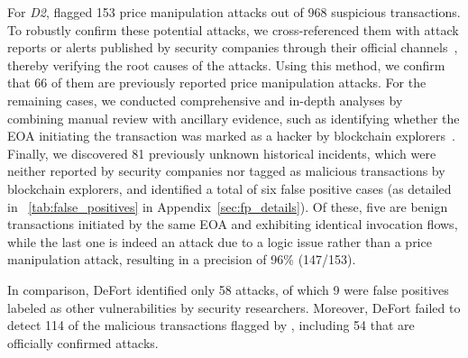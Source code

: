 For \textit{D2}, \tool flagged 153 price manipulation attacks out of 968 suspicious transactions.
To robustly confirm these potential attacks, we cross-referenced them with attack reports or alerts published by security companies through their official channels~\cite{ancilia_twi,beosin_twi,blocksec_twi,slowMist_twi}, thereby verifying the root causes of the attacks.
Using this method, we confirm that 66 of them are previously reported price manipulation attacks.
For the remaining cases, we conducted comprehensive and in-depth analyses by combining manual review with ancillary evidence, such as identifying whether the EOA initiating the transaction was marked as a hacker by blockchain explorers~\cite{bscscan,etherscan,oklink}.
Finally, we discovered 81 previously unknown historical incidents, which were neither reported by security companies nor tagged as malicious transactions by blockchain explorers, and identified a total of six false positive cases (as detailed in \mytab~\ref{tab:false_positives} in Appendix~\ref{sec:fp_details}).
Of these, five are benign transactions initiated by the same EOA and exhibiting identical invocation flows, while the last one is indeed an attack due to a logic issue rather than a price manipulation attack, resulting in a precision of 96\% (147/153).

In comparison, DeFort identified only 58 attacks, of which 9 were false positives labeled as other vulnerabilities by security researchers.
Moreover, DeFort failed to detect 114 of the malicious transactions flagged by \tool, including 54 that are officially confirmed attacks.



